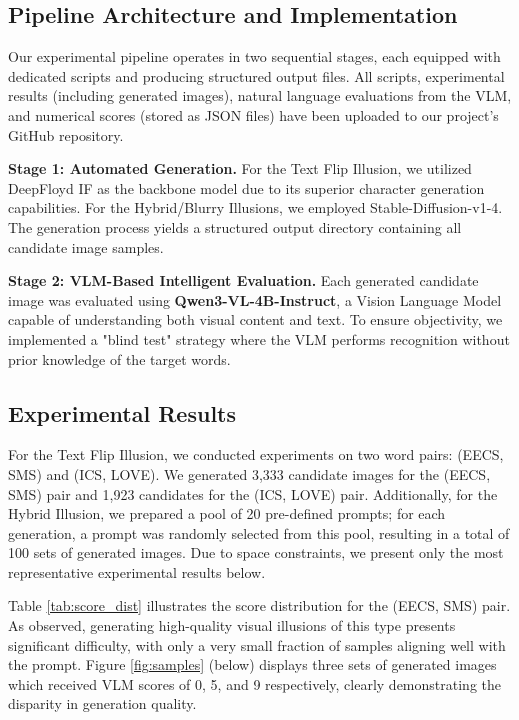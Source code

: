 \documentclass{article}
\begin{document}
\subsection{Pipeline Architecture and Implementation}
Our experimental pipeline operates in two sequential stages, each equipped with dedicated scripts and producing structured output files. All scripts, experimental results (including generated images), natural language evaluations from the VLM, and numerical scores (stored as JSON files) have been uploaded to our project's GitHub repository.

\textbf{Stage 1: Automated Generation.}
For the Text Flip Illusion, we utilized DeepFloyd IF as the backbone model due to its superior character generation capabilities. For the Hybrid/Blurry Illusions, we employed Stable-Diffusion-v1-4. The generation process yields a structured output directory containing all candidate image samples.

\textbf{Stage 2: VLM-Based Intelligent Evaluation.}
Each generated candidate image was evaluated using \textbf{Qwen3-VL-4B-Instruct}, a Vision Language Model capable of understanding both visual content and text. To ensure objectivity, we implemented a "blind test" strategy where the VLM performs recognition without prior knowledge of the target words.

\subsection{Experimental Results}
For the Text Flip Illusion, we conducted experiments on two word pairs: (EECS, SMS) and (ICS, LOVE). We generated 3,333 candidate images for the (EECS, SMS) pair and 1,923 candidates for the (ICS, LOVE) pair. Additionally, for the Hybrid Illusion, we prepared a pool of 20 pre-defined prompts; for each generation, a prompt was randomly selected from this pool, resulting in a total of 100 sets of generated images. Due to space constraints, we present only the most representative experimental results below.

Table \ref{tab:score_dist} illustrates the score distribution for the (EECS, SMS) pair. As observed, generating high-quality visual illusions of this type presents significant difficulty, with only a very small fraction of samples aligning well with the prompt. Figure \ref{fig:samples} (below) displays three sets of generated images which received VLM scores of 0, 5, and 9 respectively, clearly demonstrating the disparity in generation quality.
\end{document}
